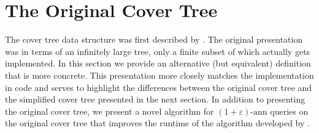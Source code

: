 \documentclass[thesis.tex]{subfiles}
\newcommand{\eann}{(1+\varepsilon)\text{-ann}}
\begin{document}

\section{The Original Cover Tree}
\label{sec:original}

The cover tree data structure was first described by \cite{beygelzimer2006cover}.
The original presentation was in terms of an infinitely large tree,
only a finite subset of which actually gets implemented.
In this section we provide an alternative (but equivalent) definition that is more concrete.
This presentation more closely matches the implementation in code and serves to highlight the differences between the original cover tree and the simplified cover tree presented in the next section.
In addition to presenting the original cover tree,
we present a novel algorithm for $\eann$ queries on the original cover tree that improves the runtime of the algorithm developed by \citet{beygelzimer2006cover}.
\end{document}
